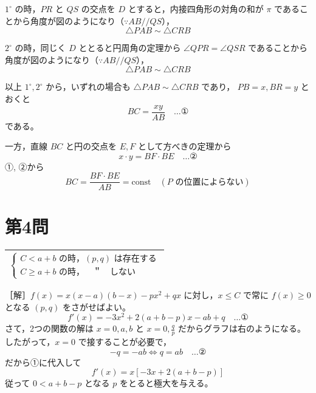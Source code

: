 \documentclass[../main.tex]{subfiles}
\begin{document}
$1^\circ$ の時，$PR$ と $QS$ の交点を $D$ とすると，内接四角形の対角の和が $\pi$ であることから角度が図のようになり（$\because AB \mathbin{/\!/} QS$），
\[
  \triangle PAB \sim \triangle CRB
\]

$2^\circ$ の時，同じく $D$ ととると円周角の定理から $\angle QPR = \angle QSR$ であることから角度が図のようになり（$\because AB \mathbin{/\!/} QS$），
\[
  \triangle PAB \sim \triangle CRB
\]

以上 $1^\circ, 2^\circ$ から，いずれの場合も $\triangle PAB \sim \triangle CRB$ であり，
$PB = x, BR = y$ とおくと
\[
  BC = \frac{xy}{AB} \quad \dots \text{①}
\]
である。

\begin{center}
\end{center}

一方，直線 $BC$ と円の交点を $E, F$ として方べきの定理から
\[
  x \cdot y = BF \cdot BE \quad \dots \text{②}
\]
①, ②から
\[
  BC = \frac{BF \cdot BE}{AB} = \text{const} \quad (P \text{ の位置によらない})
\]

\newpage

\section*{第4問}

\begin{center}
  \begin{tabular}{|l|}
    \hline
    $
    \begin{cases} C < a+b \text{ の時，} (p, q) \text{ は存在する} \\ C \ge a+b \text{ の時，} \quad \text{＂} \quad \text{しない}
    \end{cases}$ \\
    \hline
  \end{tabular}
\end{center}

［解］$f(x) = x(x-a)(b-x) - px^2 + qx$ に対し，$x \le C$ で常に $f(x) \ge 0$ となる $(p, q)$ をさがせばよい。
\[
  f'(x) = -3x^2 + 2(a+b-p)x - ab + q \quad \dots \text{①}
\]
さて，2つの関数の解は $x = 0, a, b$ と $x = 0, \frac{q}{p}$ だからグラフは右のようになる。したがって，$x=0$ で接することが必要で，
\[
  -q = -ab \iff q = ab \quad \dots \text{②}
\]
だから①に代入して
\[
  f'(x) = x [ -3x + 2(a+b-p) ]
\]
従って $0 < a+b-p$ となる $p$ をとると極大を与える。
\end{document}
